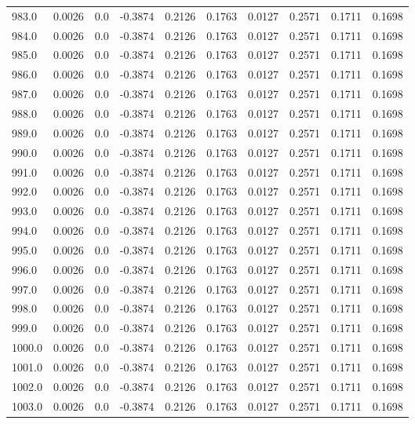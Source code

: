 \begin{longtable}{lrrrrrrrrr}
983.0 & 0.0026 & 0.0 & -0.3874 & 0.2126 & 0.1763 & 0.0127 & 0.2571 & 0.1711 & 0.1698 \\
984.0 & 0.0026 & 0.0 & -0.3874 & 0.2126 & 0.1763 & 0.0127 & 0.2571 & 0.1711 & 0.1698 \\
985.0 & 0.0026 & 0.0 & -0.3874 & 0.2126 & 0.1763 & 0.0127 & 0.2571 & 0.1711 & 0.1698 \\
986.0 & 0.0026 & 0.0 & -0.3874 & 0.2126 & 0.1763 & 0.0127 & 0.2571 & 0.1711 & 0.1698 \\
987.0 & 0.0026 & 0.0 & -0.3874 & 0.2126 & 0.1763 & 0.0127 & 0.2571 & 0.1711 & 0.1698 \\
988.0 & 0.0026 & 0.0 & -0.3874 & 0.2126 & 0.1763 & 0.0127 & 0.2571 & 0.1711 & 0.1698 \\
989.0 & 0.0026 & 0.0 & -0.3874 & 0.2126 & 0.1763 & 0.0127 & 0.2571 & 0.1711 & 0.1698 \\
990.0 & 0.0026 & 0.0 & -0.3874 & 0.2126 & 0.1763 & 0.0127 & 0.2571 & 0.1711 & 0.1698 \\
991.0 & 0.0026 & 0.0 & -0.3874 & 0.2126 & 0.1763 & 0.0127 & 0.2571 & 0.1711 & 0.1698 \\
992.0 & 0.0026 & 0.0 & -0.3874 & 0.2126 & 0.1763 & 0.0127 & 0.2571 & 0.1711 & 0.1698 \\
993.0 & 0.0026 & 0.0 & -0.3874 & 0.2126 & 0.1763 & 0.0127 & 0.2571 & 0.1711 & 0.1698 \\
994.0 & 0.0026 & 0.0 & -0.3874 & 0.2126 & 0.1763 & 0.0127 & 0.2571 & 0.1711 & 0.1698 \\
995.0 & 0.0026 & 0.0 & -0.3874 & 0.2126 & 0.1763 & 0.0127 & 0.2571 & 0.1711 & 0.1698 \\
996.0 & 0.0026 & 0.0 & -0.3874 & 0.2126 & 0.1763 & 0.0127 & 0.2571 & 0.1711 & 0.1698 \\
997.0 & 0.0026 & 0.0 & -0.3874 & 0.2126 & 0.1763 & 0.0127 & 0.2571 & 0.1711 & 0.1698 \\
998.0 & 0.0026 & 0.0 & -0.3874 & 0.2126 & 0.1763 & 0.0127 & 0.2571 & 0.1711 & 0.1698 \\
999.0 & 0.0026 & 0.0 & -0.3874 & 0.2126 & 0.1763 & 0.0127 & 0.2571 & 0.1711 & 0.1698 \\
1000.0 & 0.0026 & 0.0 & -0.3874 & 0.2126 & 0.1763 & 0.0127 & 0.2571 & 0.1711 & 0.1698 \\
1001.0 & 0.0026 & 0.0 & -0.3874 & 0.2126 & 0.1763 & 0.0127 & 0.2571 & 0.1711 & 0.1698 \\
1002.0 & 0.0026 & 0.0 & -0.3874 & 0.2126 & 0.1763 & 0.0127 & 0.2571 & 0.1711 & 0.1698 \\
1003.0 & 0.0026 & 0.0 & -0.3874 & 0.2126 & 0.1763 & 0.0127 & 0.2571 & 0.1711 & 0.1698 \\

\end{longtable}
